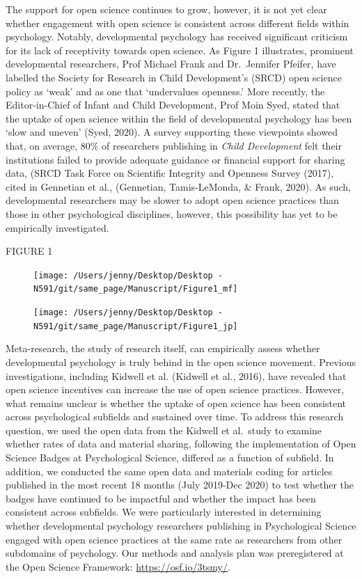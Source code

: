 \documentclass[
  english,
  man,floatsintext]{apa6}
\begin{document}
The support for open science continues to grow, however, it is not yet clear whether engagement with open science is consistent across different fields within psychology. Notably, developmental psychology has received significant criticism for its lack of receptivity towards open science. As Figure 1 illustrates, prominent developmental researchers, Prof Michael Frank and Dr.~Jennifer Pfeifer, have labelled the Society for Research in Child Development's (SRCD) open science policy as `weak' and as one that `undervalues openness.' More recently, the Editor-in-Chief of Infant and Child Development, Prof Moin Syed, stated that the uptake of open science within the field of developmental psychology has been `slow and uneven' (Syed, 2020). A survey supporting these viewpoints showed that, on average, 80\% of researchers publishing in \emph{Child Development} felt their institutions failed to provide adequate guidance or financial support for sharing data, (SRCD Task Force on Scientific Integrity and Openness Survey (2017), cited in Gennetian et al., (Gennetian, Tamis-LeMonda, \& Frank, 2020). As such, developmental researchers may be slower to adopt open science practices than those in other psychological disciplines, however, this possibility has yet to be empirically investigated.

FIGURE 1

\begin{figure}
\texttt{[image: /Users/jenny/Desktop/Desktop - N591/git/same\_page/Manuscript/Figure1\_mf]} \caption{ }\label{fig:unnamed-chunk-1-1}
\end{figure}
\begin{figure}
\texttt{[image: /Users/jenny/Desktop/Desktop - N591/git/same\_page/Manuscript/Figure1\_jp]} \caption{ }\label{fig:unnamed-chunk-1-2}
\end{figure}

Meta-research, the study of research itself, can empirically assess whether developmental psychology is truly behind in the open science movement. Previous investigations, including Kidwell et al. (Kidwell et al., 2016), have revealed that open science incentives can increase the use of open science practices. However, what remains unclear is whether the uptake of open science has been consistent across psychological subfields and sustained over time. To address this research question, we used the open data from the Kidwell et al.~study to examine whether rates of data and material sharing, following the implementation of Open Science Badges at Psychological Science, differed as a function of subfield. In addition, we conducted the same open data and materials coding for articles published in the most recent 18 months (July 2019-Dec 2020) to test whether the badges have continued to be impactful and whether the impact has been consistent across subfields. We were particularly interested in determining whether developmental psychology researchers publishing in Psychological Science engaged with open science practices at the same rate as researchers from other subdomains of psychology. Our methods and analysis plan was preregistered at the Open Science Framework: \url{https://osf.io/3tsmy/}.
\end{document}
